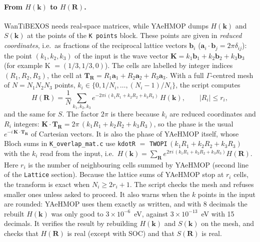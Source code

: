 \documentclass[11pt,a4paper]{article}
\newcommand{\file}[1]{\texttt{#1}}
\newcommand{\var}[1]{\texttt{#1}}
\begin{document}
\paragraph{From $H(\mathbf{k})$ to $H(\mathbf{R})$.} WanTiBEXOS needs real-space matrices,
while YAeHMOP dumps $H(\mathbf{k})$ and $S(\mathbf{k})$ at the points of the \texttt{K points}
block. These points are given in \emph{reduced coordinates}, i.e.\ as fractions of the
reciprocal lattice vectors $\mathbf{b}_i$ ($\mathbf{a}_i\cdot\mathbf{b}_j=2\pi\delta_{ij}$):
the point $(k_1,k_2,k_3)$ of the input is the wave vector
$\mathbf{K}=k_1\mathbf{b}_1+k_2\mathbf{b}_2+k_3\mathbf{b}_3$ (for example K $=(1/3,1/3,0)$).
The cells are labelled by integer indices $(R_1,R_2,R_3)$, the cell at
$\mathbf{T}_\mathbf{R}=R_1\mathbf{a}_1+R_2\mathbf{a}_2+R_3\mathbf{a}_3$. With a full
$\Gamma$-centred mesh of $N=N_1N_2N_3$ points, $k_i\in\{0,1/N_i,\ldots,(N_i-1)/N_i\}$, the
script computes
\begin{equation}
H(\mathbf{R}) = \frac1N\sum_{k_1,k_2,k_3} e^{-2\pi i\,(k_1R_1+k_2R_2+k_3R_3)}\,H(\mathbf{k}),
\qquad |R_i|\le r_i ,
\end{equation}
and the same for $S$. The factor $2\pi$ is there because $k_i$ are reduced coordinates and
$R_i$ integers: $\mathbf{K}\cdot\mathbf{T}_\mathbf{R} = 2\pi\,(k_1R_1+k_2R_2+k_3R_3)$, so the
phase is the usual $e^{-i\,\mathbf{K}\cdot\mathbf{T}_\mathbf{R}}$ of Cartesian vectors. It is
also the phase of YAeHMOP itself, whose Bloch sums in \file{K\_overlap\_mat.c} use
\var{kdotR} $=$ \var{TWOPI}$\,(k_1R_1+k_2R_2+k_3R_3)$ with the $k_i$ read from the input,
i.e.\ $H(\mathbf{k})=\sum_\mathbf{R} e^{2\pi i\,(k_1R_1+k_2R_2+k_3R_3)}H(\mathbf{R})$.
Here $r_i$ is the number of neighbouring cells summed by YAeHMOP
(second line of the \texttt{Lattice} section). Because the lattice sums of YAeHMOP stop at
$r_i$ cells, the transform is exact when $N_i\ge 2r_i+1$. The script checks the mesh
and refuses smaller ones unless asked to proceed. It also warns when the $k$ points in the
input are rounded: YAeHMOP uses them exactly as written, and with 8 decimals the rebuilt
$H(\mathbf{k})$ was only good to $3\times10^{-6}$~eV, against $3\times10^{-13}$~eV with 15
decimals. It verifies the result by rebuilding $H(\mathbf{k})$ and $S(\mathbf{k})$ on the
mesh, and checks that $H(\mathbf{R})$ is real (except with SOC) and that $S(\mathbf{R})$ is
real.
\end{document}
